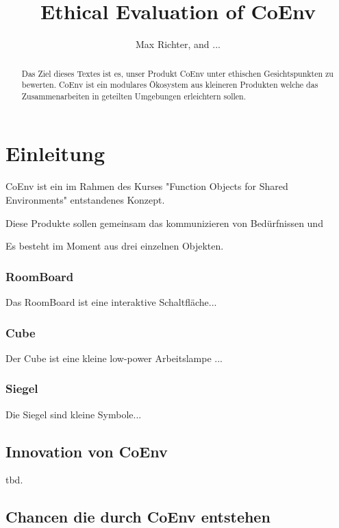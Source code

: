 \documentclass{article}
\title{Ethical Evaluation of CoEnv}
\author{Max Richter, and ...}
\begin{document}
\maketitle

\begin{abstract}
Das Ziel dieses Textes ist es, unser Produkt CoEnv unter ethischen Gesichtspunkten zu bewerten. CoEnv ist ein modulares Ökosystem aus kleineren Produkten welche das Zusammenarbeiten in geteilten Umgebungen erleichtern sollen.
\end{abstract}

\section{Einleitung}

CoEnv ist ein im Rahmen des Kurses "Function Objects for Shared Environments" entstandenes Konzept. 

Diese Produkte sollen gemeinsam das kommunizieren von Bedürfnissen und 

Es besteht im Moment aus drei einzelnen Objekten.

\subsubsection*{RoomBoard} 

Das RoomBoard ist eine interaktive Schaltfläche...

\subsubsection*{Cube}

Der Cube ist eine kleine low-power Arbeitslampe ...

\subsubsection*{Siegel}

Die Siegel sind kleine Symbole...

\subsection{Innovation von CoEnv}

tbd.

\subsection{Chancen die durch CoEnv entstehen}
\end{document}
